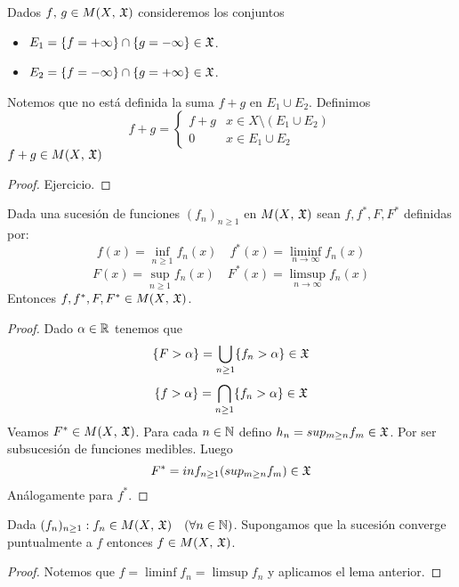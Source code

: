 \begin{note}
    Dados $f\text{, } g \in M(X\text{, } \mathfrak{X})$ consideremos los conjuntos \begin{itemize}
        \item $E_1 = \{ f = + \infty \} \cap \{ g = - \infty \} \in \mathfrak{X}$.
        \item $E_2 = \{ f = - \infty \} \cap \{ g = + \infty \} \in \mathfrak{X}$.
    \end{itemize}
    Notemos que no está definida la suma $f + g$ en $E_1 \cup E_2$.
    Definimos \begin{equation*}
        f+g = \begin{cases}
            f+g & x \in X \setminus (E_1 \cup E_2) \\
            0   & x \in E_1 \cup E_2
        \end{cases}
    \end{equation*}
    $f+g \in M(X\text{, } \mathfrak{X})$
    \begin{proof}
        Ejercicio.
    \end{proof}
\end{note}

\begin{lemma}
    Dada una sucesión de funciones $(f_n)_{n \geq 1}$ en $M(X\text{, } \mathfrak{X})$ sean $f, f^*, F, F^*$ definidas por:
    \begin{equation*}
        f(x) = \inf_{n \geq 1} f_n(x) \quad f^*(x) = \liminf_{n \to \infty} f_n(x)
    \end{equation*}
    \begin{equation*}
        F(x) = \sup_{n \geq 1} f_n(x) \quad F^*(x) = \limsup_{n \to \infty} f_n(x)
    \end{equation*}
    Entonces $f, f^*, F, F^* \in M(X\text{, } \mathfrak{X})$.
    \begin{proof}
        Dado $\alpha \in \mathbb{R}$ tenemos que \begin{equation*}
            \{ F > \alpha \} = \bigcup_{n \geq 1} \{ f_n > \alpha \} \in \mathfrak{X}
        \end{equation*}
        \begin{equation*}
            \{ f > \alpha \} = \bigcap_{n \geq 1} \{ f_n > \alpha \} \in \mathfrak{X}
        \end{equation*}
        Veamos $F^* \in M(X\text{, } \mathfrak{X})$. Para cada $n \in \mathbb{N}$ defino $h_n = sup_{m \geq n} f_m \in \mathfrak{X}$. Por ser subsucesión de funciones medibles.
        Luego \begin{equation*}
            F^* = inf_{n \geq 1} (sup_{m \geq n} f_m) \in \mathfrak{X}
        \end{equation*}
        Análogamente para $f^*$.
    \end{proof}
\end{lemma}

\begin{corollary}
    Dada $(f_n)_{n \geq 1} : f_n \in M(X\text{, } \mathfrak{X}) \quad (\forall n \in \mathbb{N})$. Supongamos que la sucesión converge puntualmente a $f$ entonces $f \in M(X\text{, } \mathfrak{X})$.
    \begin{proof}
        Notemos que $f = \liminf f_n = \limsup f_n$ y aplicamos el lema anterior.
    \end{proof}
\end{corollary}